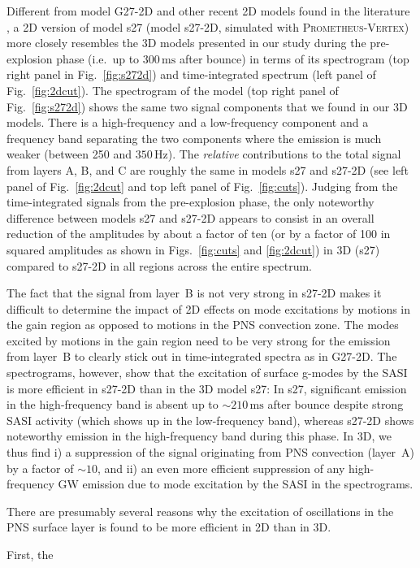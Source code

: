 {Different from model G27-2D and other recent 2D models found in
  the literature \citep{marek_08,murphy_09,mueller_13}, a 2D version of
  model s27 (model s27-2D, simulated with \textsc{Prometheus-Vertex})
  more closely resembles the 3D models presented in our study during
  the pre-explosion phase (i.e.\ up to $300\, \mathrm{ms}$ after
  bounce) in terms of its spectrogram (top right panel in
  Fig.~\ref{fig:s272d}) and time-integrated spectrum (left panel of
  Fig.~\ref{fig:2dcut}).  The spectrogram of the model (top right
  panel of Fig.~\ref{fig:s272d}) shows the same two signal components
  that we found in our 3D models. There is a high-frequency and a
  low-frequency component and a frequency band separating the two
  components where the emission is much weaker (between 250 and $350\,
  \mathrm{Hz}$).  The \emph{relative} contributions to the total
  signal from layers A, B, and C are roughly the same in models s27 and
  s27-2D (see left panel of Fig.~\ref{fig:2dcut} and top left panel of
  Fig.~\ref{fig:cuts}).  Judging from the time-integrated signals from
  the pre-explosion phase, the only noteworthy difference between
  models s27 and s27-2D appears to consist in an overall reduction of
  the amplitudes by about a factor of ten (or by a factor of 100 in
  squared amplitudes as shown in Figs.~\ref{fig:cuts} and
  \ref{fig:2dcut}) in 3D (s27) compared to s27-2D in all regions
  across the entire spectrum. 

  The fact that the signal from layer~B is not very strong
  in s27-2D makes it difficult to determine the impact of 2D effects
  on mode excitations by motions in the gain
  region as opposed to motions in the PNS convection zone. The
  modes excited by motions in the gain region need to be very strong for
  the emission from layer~B to clearly stick out in time-integrated
  spectra as in G27-2D. The spectrograms, however, show that
  the excitation of surface g-modes by the SASI is more efficient
  in s27-2D than in the 3D model s27: In s27, significant emission in
  the high-frequency band is absent up to $\mathord{\sim} 210\, \mathrm{ms}$
  after bounce despite strong SASI activity (which shows up
  in the low-frequency band), whereas s27-2D shows noteworthy
  emission in the high-frequency band during this phase.
In 3D, we thus find i) a suppression of the signal originating
from PNS convection (layer~A) by a factor of $\mathord{\sim 10}$,
and ii) an even more efficient suppression of
any high-frequency GW emission due to mode excitation
by the SASI in the spectrograms. 

There are presumably several reasons why the excitation of
oscillations in the PNS surface layer is found to be more efficient
in 2D than in 3D.}  First, the
